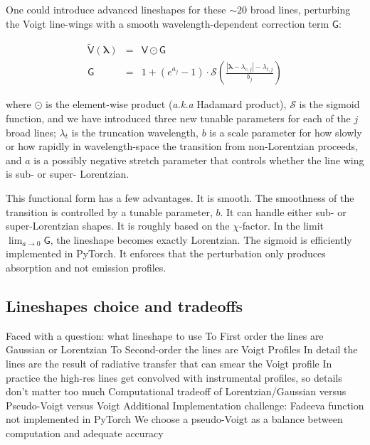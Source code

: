 \documentclass[modern]{aastex631}
\begin{document}
One could introduce advanced lineshapes for these $\sim20$ broad lines, perturbing the Voigt line-wings with a smooth wavelength-dependent correction term $\mathsf{G}$:

\begin{eqnarray}
    \mathsf{\tilde{V}(\bm{\lambda})} &=& \mathsf{V} \odot \mathsf{G}\\
    \mathsf{G} &=& 1 + (e^{a_j} - 1) \cdot \mathcal{S}\left(\frac{|\bm{\lambda}-\lambda_{c,j}| - \lambda_{t, j}}{b_j}\right)
\end{eqnarray}

where $\odot$ is the element-wise product (\emph{a.k.a} Hadamard product), $\mathcal{S}$ is the sigmoid function, and we have introduced three new tunable parameters for each of the $j$ broad lines; $\lambda_t$ is the truncation wavelength, $b$ is a scale parameter for how slowly or how rapidly in wavelength-space the transition from non-Lorentzian proceeds, and $a$ is a possibly negative stretch parameter that controls whether the line wing is sub- or super- Lorentzian.

This functional form has a few advantages. It is smooth. The smoothness of the transition is controlled by a tunable parameter, $b$. It can handle either sub- or super-Lorentzian shapes. It is roughly based on the $\chi$-factor. In the limit $\lim_{a\to0} \mathsf{G}$, the lineshape becomes exactly Lorentzian. The sigmoid is efficiently implemented in PyTorch.
It enforces that the perturbation only produces absorption and not emission profiles.



\subsection{Lineshapes choice and tradeoffs}
\begin{outline}
    \1 Faced with a question: what lineshape to use
    \2 To First order the lines are Gaussian or Lorentzian
    \2 To Second-order the lines are Voigt Profiles
    \2 In detail the lines are the result of radiative transfer that can smear the Voigt profile
    \2 In practice the high-res lines get convolved with instrumental profiles, so details don't matter too much
    \1 Computational tradeoff of Lorentzian/Gaussian versus Pseudo-Voigt versus Voigt
    \2 Additional Implementation challenge: Fadeeva function not implemented in PyTorch
    \1 We choose a pseudo-Voigt as a balance between computation and adequate accuracy
\end{outline}
\end{document}

